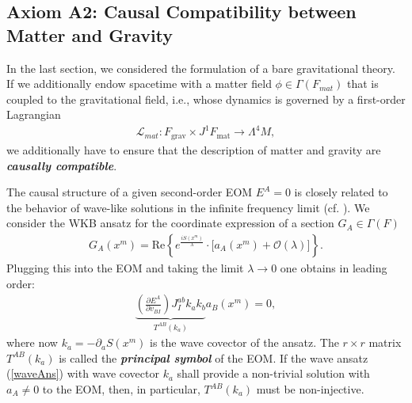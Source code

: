 \documentclass[%
 reprint,
nofootinbib,
 amsmath,amssymb,
 aps,
 prd,
floatfix,
]{revtex4-2}
\begin{document}
\subsection{Axiom A2: Causal Compatibility between Matter and Gravity}

In the last section, we considered the formulation of a bare gravitational theory. If we additionally endow spacetime with a matter field $\phi \in  \Gamma(F_{mat})$ that is coupled to the gravitational field, i.e., whose dynamics is governed by a first-order Lagrangian
\begin{align}\label{matterL}
    \mathcal{L}_{mat} : F_\text{grav} \times J^1F_\text{mat} \longrightarrow \Lambda^4M,
\end{align}
we additionally have to ensure that the description of matter and gravity are \textit{\textbf{causally compatible}}.

The causal structure of a given second-order EOM $E^A=0$ is closely related to the behavior of wave-like solutions in the infinite frequency limit (cf. \cite{2018PhRvD..97h4036D}). We consider the WKB ansatz for the coordinate expression of a section $G_A \in \Gamma(F)$
\begin{align}\label{waveAns}
    G_A(x^m) = \mathrm{Re}\left \{ e^{\frac{iS(x^m)}{\lambda}} \cdot   \bigl [ a_A(x^m) + \mathcal{O}(\lambda) \bigr ]\right \}.
\end{align}
Plugging this into the EOM and taking the limit $\lambda \rightarrow 0$ one obtains in leading order:
\begin{align}
    \underbrace{\left ( \frac{\partial E^A }{\partial v_{BI}} \right ) J_{I}^{ab} k_a k_b}_{T^{AB}(k_a)} a_B(x^m) = 0,
\end{align}
where now $k_a = - \partial_aS(x^m)$ is the wave covector of the ansatz. The $r\times r$ matrix $T^{AB}(k_a)$ is called the \textit{\textbf{principal symbol}} of the EOM. If the wave ansatz (\ref{waveAns}) with wave covector $k_a$ shall provide a non-trivial solution with $a_A \neq 0$ to the EOM, then, in particular,  $T^{AB}(k_a)$ must be non-injective. 
\end{document}
